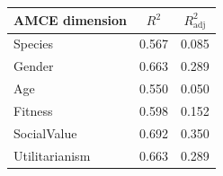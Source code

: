 \begin{tabular}{lcc}\toprule
AMCE dimension & $R^2$ & $R^2_{\text{adj}}$ \\\midrule
Species & 0.567 & 0.085 \\
Gender & 0.663 & 0.289 \\
Age & 0.550 & 0.050 \\
Fitness & 0.598 & 0.152 \\
SocialValue & 0.692 & 0.350 \\
Utilitarianism & 0.663 & 0.289 \\
\bottomrule
\end{tabular}
